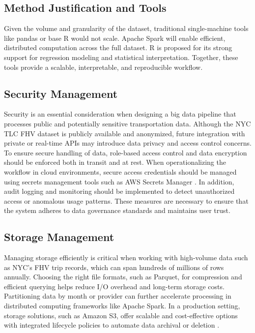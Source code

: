 \documentclass[12pt,letterpaper]{article}
\begin{document}
\subsection{Method Justification and Tools}
Given the volume and granularity of the dataset, traditional single-machine tools like pandas or base R would not scale. Apache Spark will enable efficient, distributed computation across the full dataset. R is proposed for its strong support for regression modeling and statistical interpretation. Together, these tools provide a scalable, interpretable, and reproducible workflow.

\subsection{Security Management}
Security is an essential consideration when designing a big data pipeline that processes public and potentially sensitive transportation data. Although the NYC TLC FHV dataset is publicly available and anonymized, future integration with private or real-time APIs may introduce data privacy and access control concerns. To ensure secure handling of data, role-based access control and data encryption should be enforced both in transit and at rest. When operationalizing the workflow in cloud environments, secure access credentials should be managed using secrets management tools such as AWS Secrets Manager \cite{awsSecretsManager2025}. In addition, audit logging and monitoring should be implemented to detect unauthorized access or anomalous usage patterns. These measures are necessary to ensure that the system adheres to data governance standards and maintains user trust.

\subsection{Storage Management}
Managing storage efficiently is critical when working with high-volume data such as NYC's FHV trip records, which can span hundreds of millions of rows annually. Choosing the right file formats, such as Parquet, for compression and efficient querying helps reduce I/O overhead and long-term storage costs. Partitioning data by month or provider can further accelerate processing in distributed computing frameworks like Apache Spark. In a production setting, storage solutions, such as Amazon S3, offer scalable and cost-effective options with integrated lifecycle policies to automate data archival or deletion \cite{awsS3}.
\end{document}
